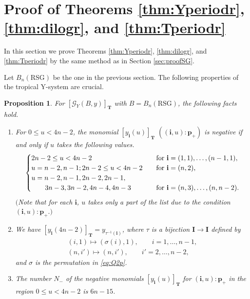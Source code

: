 \documentclass[pdftex]{sigma}
\numberwithin{equation}{section}
\newtheorem{Proposition}[Theorem]{Proposition}
\theoremstyle{definition}
\begin{document}
\section{Proof of
Theorems \ref{thm:Yperiodr}, \ref{thm:dilogr},
and \ref{thm:Tperiodr}}
\label{sec:proofRSG}

In this section we prove
Theorems \ref{thm:Yperiodr}, \ref{thm:dilogr},
and \ref{thm:Tperiodr}
by the same method as in Section \ref{sec:proofSG}.
\label{sec:proofSGr}



Let $B_n(\mathrm{RSG})$ be the one in the previous section.
The following properties
of the tropical Y-system are crucial.

\begin{Proposition}
\label{prop:lev2r}
 For
$[\mathcal{G}_Y(B,y)]_{\mathbf{T}}$
with $B=B_{n}(\mathrm{RSG})$, the following facts hold.

\begin{enumerate}\itemsep=0pt
\item[$(i)$]  For $0 \le u < 4n-2$,
the  monomial $[y_{\mathbf{i}}(u)]_{\mathbf{T}}$
$((\mathbf{i},u):\mathbf{p}_+)$
is negative if and only if $u$ takes the following values.
\begin{gather*}
\begin{cases}
2n-2 \leq u < 4n-2  &
\quad\mbox{\rm for $\mathbf{i}=(1,1),\dots,(n-1,1)$},\\
u=n-2,n-1; 2n-2\leq u < 4n-2 &
\quad\mbox{\rm for $\mathbf{i}=(n,2)$},\\
u=n-2,n-1,2n-2,2n-1, &
\\
\quad\quad3n-3, 3n-2,4n-4,4n-3 &\quad\mbox{\rm for $\mathbf{i}=(n,3),\dots,(n,n-2)$}.
\end{cases}
\end{gather*}
$($Note that for each $\mathbf{i}$, $u$ takes only a part
of the list due to the condition $(\mathbf{i},u):\mathbf{p}_+.)$

\item[$(ii)$]
 We have $[y_{\mathbf{i}}(4n-2)]_{\mathbf{T}}
=y_{\tau^{-1}(\mathbf{i})}$,
where $\tau$ is a bijection $\mathbf{I} \rightarrow
\mathbf{I}$ defined by
\begin{gather*}
(i,1)  \mapsto (\sigma(i),1),
\qquad i=1,\dots,n-1,\\
(n,i')   \mapsto
(n,i'),\qquad i'=2,\dots,n-2,
\end{gather*}
and $\sigma$ is the permutation in \eqref{eq:Q2p}.

\item[$(iii)$] The number $N_-$ of the negative monomials
$[y_{\mathbf{i}}(u)]_{\mathbf{T}}$ for $(\mathbf{i},u):\mathbf{p}_+$
in the region $0\leq u < 4n-2$ is $6n-15$.
\end{enumerate}
\end{Proposition}
\end{document}
